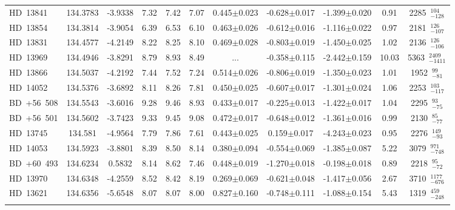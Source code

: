 {\begin{longtable}{lcccccccccc}
\noalign{\smallskip}
HD~13841 & 134.3783 & -3.9338 & 7.32 & 7.42 & 7.07 & 0.445$\pm$0.023 & -0.628$\pm$0.017 & -1.399$\pm$0.020 & 0.91 & 2285~$_{-128}^{104}$ \\
\noalign{\smallskip}
HD~13854 & 134.3814 & -3.9054 & 6.39 & 6.53 & 6.10 & 0.463$\pm$0.026 & -0.612$\pm$0.016 & -1.116$\pm$0.022 & 0.97 & 2181~$_{-107}^{126}$ \\
\noalign{\smallskip}
HD~13831 & 134.4577 & -4.2149 & 8.22 & 8.25 & 8.10 & 0.469$\pm$0.028 & -0.803$\pm$0.019 & -1.450$\pm$0.025 & 1.02 & 2136~$_{-106}^{126}$ \\
\noalign{\smallskip}
HD~13969 & 134.4946 & -3.8291 & 8.79 & 8.93 & 8.49 & ... & -0.358$\pm$0.115 & -2.442$\pm$0.159 & 10.03 & 5363~$_{-1411}^{2409}$ \\
\noalign{\smallskip}
HD~13866 & 134.5037 & -4.2192 & 7.44 & 7.52 & 7.24 & 0.514$\pm$0.026 & -0.806$\pm$0.019 & -1.350$\pm$0.023 & 1.01 & 1952~$_{-81}^{99}$ \\
\noalign{\smallskip}
HD~14052 & 134.5376 & -3.6892 & 8.11 & 8.26 & 7.81 & 0.450$\pm$0.025 & -0.607$\pm$0.017 & -1.301$\pm$0.024 & 1.06 & 2253~$_{-117}^{103}$ \\
\noalign{\smallskip}
BD~+56~508 & 134.5543 & -3.6016 & 9.28 & 9.46 & 8.93 & 0.433$\pm$0.017 & -0.225$\pm$0.013 & -1.422$\pm$0.017 & 1.04 & 2295~$_{-75}^{93}$ \\
\noalign{\smallskip}
BD~+56~501 & 134.5602 & -3.7423 & 9.33 & 9.45 & 9.08 & 0.472$\pm$0.017 & -0.648$\pm$0.012 & -1.361$\pm$0.016 & 0.99 & 2130~$_{-77}^{85}$ \\
\noalign{\smallskip}
HD~13745 & 134.581 & -4.9564 & 7.79 & 7.86 & 7.61 & 0.443$\pm$0.025 & 0.159$\pm$0.017 & -4.243$\pm$0.023 & 0.95 & 2276~$_{-93}^{149}$ \\
\noalign{\smallskip}
HD~14053 & 134.5923 & -3.8801 & 8.39 & 8.50 & 8.14 & 0.380$\pm$0.094 & -0.554$\pm$0.069 & -1.385$\pm$0.087 & 5.22 & 3079~$_{-748}^{971}$ \\
\noalign{\smallskip}
BD~+60~493 & 134.6234 & 0.5832 & 8.14 & 8.62 & 7.46 & 0.448$\pm$0.019 & -1.270$\pm$0.018 & -0.198$\pm$0.018 & 0.89 & 2218~$_{-72}^{95}$ \\
\noalign{\smallskip}
HD~13970 & 134.6348 & -4.2559 & 8.52 & 8.42 & 8.19 & 0.269$\pm$0.069 & -0.621$\pm$0.048 & -1.417$\pm$0.056 & 2.67 & 3710~$_{-676}^{1177}$ \\
\noalign{\smallskip}
HD~13621 & 134.6356 & -5.6548 & 8.07 & 8.07 & 8.00 & 0.827$\pm$0.160 & -0.748$\pm$0.111 & -1.088$\pm$0.154 & 5.43 & 1319~$_{-248}^{459}$ \\
\noalign{\smallskip}

\end{longtable}}
